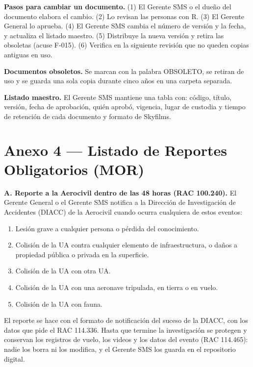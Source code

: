 \textbf{Pasos para cambiar un documento.} (1) El Gerente SMS o el dueño del documento elabora el cambio. (2) Lo revisan las personas con R. (3) El Gerente General lo aprueba. (4) El Gerente SMS cambia el número de versión y la fecha, y actualiza el listado maestro. (5) Distribuye la nueva versión y retira las obsoletas (acuse F-015). (6) Verifica en la siguiente revisión que no queden copias antiguas en uso.

\textbf{Documentos obsoletos.} Se marcan con la palabra OBSOLETO, se retiran de uso y se guarda una sola copia durante cinco años en una carpeta separada.

\textbf{Listado maestro.} El Gerente SMS mantiene una tabla con: código, título, versión, fecha de aprobación, quién aprobó, vigencia, lugar de custodia y tiempo de retención de cada documento y formato de Skyfilms.

\clearpage
\section*{Anexo 4 --- Listado de Reportes Obligatorios (MOR)}
\textbf{A. Reporte a la Aerocivil dentro de las 48 horas (RAC 100.240).} El Gerente General o el Gerente SMS notifica a la Dirección de Investigación de Accidentes (DIACC) de la Aerocivil cuando ocurra cualquiera de estos eventos:
\begin{enumerate}
    \item Lesión grave a cualquier persona o pérdida del conocimiento.
    \item Colisión de la UA contra cualquier elemento de infraestructura, o daños a propiedad pública o privada en la superficie.
    \item Colisión de la UA con otra UA.
    \item Colisión de la UA con una aeronave tripulada, en tierra o en vuelo.
    \item Colisión de la UA con fauna.
\end{enumerate}
El reporte se hace con el formato de notificación del suceso de la DIACC, con los datos que pide el RAC 114.336. Hasta que termine la investigación se protegen y conservan los registros de vuelo, los videos y los datos del evento (RAC 114.465): nadie los borra ni los modifica, y el Gerente SMS los guarda en el repositorio digital.

